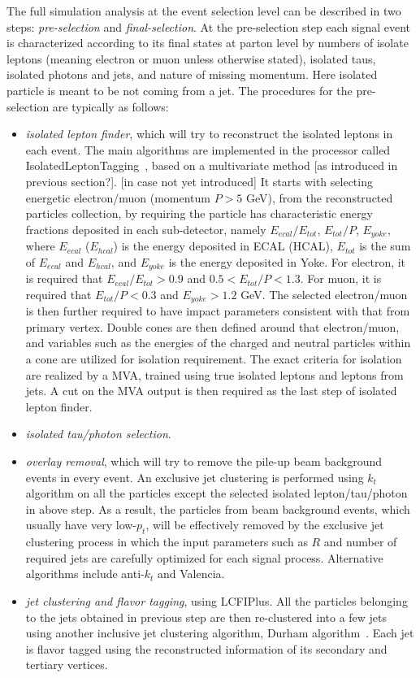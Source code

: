 The full simulation analysis at the event selection level can be described 
in two steps: {\it pre-selection} and {\it final-selection}. At the pre-selection step
each signal event is characterized according to its final states at parton level by
numbers of isolate leptons (meaning electron or muon unless otherwise stated), 
isolated taus, isolated photons and jets, and nature of missing momentum.
Here isolated particle is meant to be not coming from a jet. The procedures
for the pre-selection are typically as follows:
\begin{itemize}
\item {\it isolated lepton finder}, which will try to reconstruct the isolated leptons
in each event. The main algorithms are implemented in the processor called
IsolatedLeptonTagging~\cite{}, based on a multivariate method [as introduced in 
previous section?]. [in case not yet introduced]
It starts with selecting energetic electron/muon (momentum $P>5$ GeV), 
from the reconstructed particles collection, by requiring the particle has characteristic
energy fractions deposited in each sub-detector, namely $E_{ecal}/E_{tot}$,
$E_{tot}/P$, $E_{yoke}$, where $E_{ecal}$ ($E_{hcal}$) is the energy deposited 
in ECAL (HCAL), $E_{tot}$ is the sum of $E_{ecal}$ and $E_{hcal}$, and
$E_{yoke}$ is the energy deposited in Yoke. For electron, 
it is required that $E_{ecal}/E_{tot}>0.9$ and $0.5<E_{tot}/P<1.3$. For muon,
it is required that $E_{tot}/P<0.3$ and $E_{yoke}>1.2$ GeV. The selected
electron/muon is then further required to have impact parameters consistent with
that from primary vertex. Double cones are then defined around that electron/muon,
and variables such as the energies of the charged and neutral particles within a cone 
are utilized for isolation requirement. The exact criteria for isolation 
are realized by a MVA, trained using true isolated leptons and leptons from jets.
A cut on the MVA output is then required as the last step of isolated lepton finder.
\item {\it isolated tau/photon selection}.
\item {\it overlay removal}, which will try to remove the pile-up beam background
events in every event. An exclusive jet clustering is performed using $k_t$ algorithm
on all the particles except the selected isolated lepton/tau/photon in above step. 
As a result, the particles from beam background events, which usually have very low-$p_t$, 
will be effectively removed by the exclusive jet clustering process in which the 
input parameters such as $R$ and number of required jets are carefully optimized 
for each signal process. Alternative algorithms include anti-$k_t$ and Valencia.
\item {\it jet clustering and flavor tagging}, using LCFIPlus. 
All the particles belonging to the
jets obtained in previous step are then re-clustered into a few jets using another inclusive 
jet clustering algorithm, Durham algorithm~\cite{}.
Each jet is flavor tagged using the reconstructed information of 
its secondary and tertiary vertices. 
\end{itemize}
